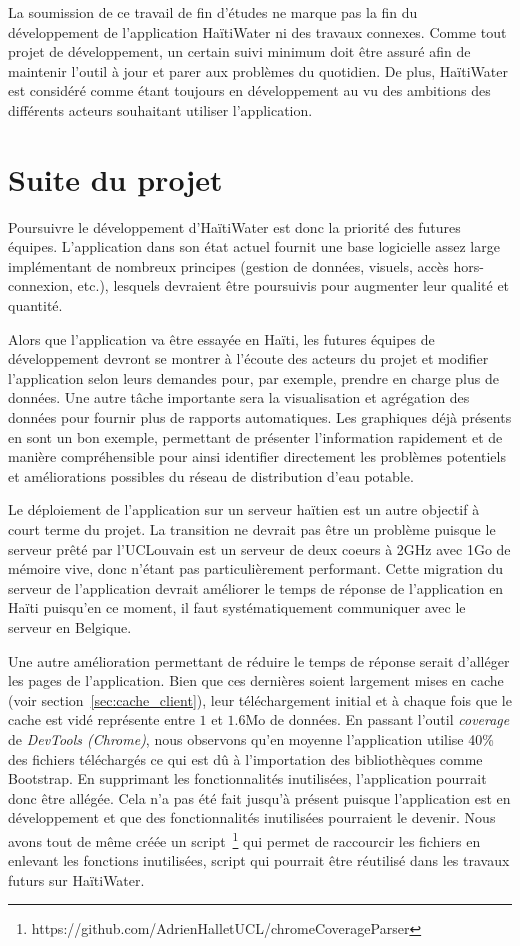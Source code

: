 \documentclass{EPL-master-thesis-covers-FR}
\begin{document}
		La soumission de ce travail de fin d'études ne marque pas la fin du développement de l'application HaïtiWater ni des travaux connexes. Comme tout projet de développement, un certain suivi minimum doit être assuré afin de maintenir l'outil à jour et parer aux problèmes du quotidien. De plus, HaïtiWater est considéré comme étant toujours en développement au vu des ambitions des différents acteurs souhaitant utiliser l'application.

		\section{Suite du projet}
			\label{ref:suite_projet}

			Poursuivre le développement d'HaïtiWater est donc la priorité des futures équipes. L'application dans son état actuel fournit une base logicielle assez large implémentant de nombreux principes (gestion de données, visuels, accès hors-connexion, etc.), lesquels devraient être poursuivis pour augmenter leur qualité et quantité.

			Alors que l'application va être essayée en Haïti, les futures équipes de développement devront se montrer à l'écoute des acteurs du projet et modifier l'application selon leurs demandes pour, par exemple, prendre en charge plus de données. Une autre tâche importante sera la visualisation et agrégation des données pour fournir plus de rapports automatiques. Les graphiques déjà présents en sont un bon exemple, permettant de présenter l'information rapidement et de manière compréhensible pour ainsi identifier directement les problèmes potentiels et améliorations possibles du réseau de distribution d'eau potable.

			Le déploiement de l'application sur un serveur haïtien est un autre objectif à court terme du projet. La transition ne devrait pas être un problème puisque le serveur prêté par l'UCLouvain est un serveur de deux coeurs à 2GHz avec 1Go de mémoire vive, donc n'étant pas particulièrement performant. Cette migration du serveur de l'application devrait améliorer le temps de réponse de l'application en Haïti puisqu'en ce moment, il faut systématiquement communiquer avec le serveur en Belgique.

			Une autre amélioration permettant de réduire le temps de réponse serait d'alléger les pages de l'application. Bien que ces dernières soient largement mises en cache (voir section~\ref{sec:cache_client}), leur téléchargement initial et à chaque fois que le cache est vidé représente entre $1$ et $1.6$Mo de données. En passant l'outil \emph{coverage} de \emph{DevTools (Chrome)}, nous observons qu'en moyenne l'application utilise 40\% des fichiers téléchargés ce qui est dû à l'importation des bibliothèques comme Bootstrap. En supprimant les fonctionnalités inutilisées, l'application pourrait donc être allégée. Cela n'a pas été fait jusqu'à présent puisque l'application est en développement et que des fonctionnalités inutilisées pourraient le devenir. Nous avons tout de même créée un script~\footnote{https://github.com/AdrienHalletUCL/chromeCoverageParser} qui permet de raccourcir les fichiers en enlevant les fonctions inutilisées, script qui pourrait être réutilisé dans les travaux futurs sur HaïtiWater.
\end{document}
